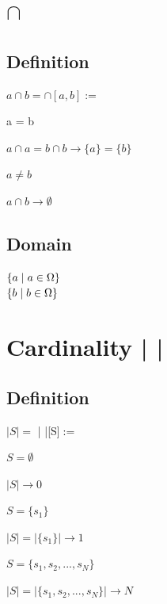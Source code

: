 \documentclass[11pt]{article}
\begin{document}
\newpage
\section{$\cap$}
\subsection{Definition}
\begin{center}
$
a \cap b = \cap[a,b] :=
$
\end{center}
\vspace{2mm}
a = b
\begin{center}
$
a \cap a = b \cap b \rightarrow \{a\} = \{b\}
$
\end{center}
\vspace{2mm}
$a \neq b$
\begin{center}
$
a \cap b \rightarrow \emptyset
$
\end{center}
\subsection{Domain}
\begin{center}
$
\{ a \hspace{1mm}|\hspace{1mm} a \in \Omega\}
$
\\ \vspace{2mm}
$
\{ b \hspace{1mm}|\hspace{1mm} b \in \Omega\}
$
\end{center}








\newpage
\section{Cardinality | |}
\subsection{Definition}
\begin{center}
$
|S| = $ | |[S\hspace{.2mm}]$:=
$
\end{center}
$S = \emptyset$
\begin{center}
$
|S| \rightarrow 0
$
\end{center}
$S = \{s_1\}$
\begin{center}
$
|S| = |\{s_1\}| \rightarrow 1
$
\end{center}
$S = \{s_1,s_2,...,s_N\}$
\begin{center}
$
|S| = |\{s_1,s_2,...,s_N\}| \rightarrow N
$
\end{center}
\end{document}
